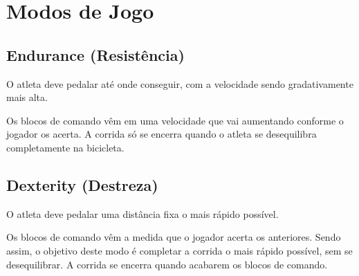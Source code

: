 \section{Modos de Jogo} 

\subsection{Endurance (Resistência)}

O atleta deve pedalar até onde conseguir, com a velocidade sendo gradativamente mais alta.

Os blocos de comando vêm em uma velocidade que vai aumentando conforme o jogador os acerta. A corrida só se encerra quando o atleta se desequilibra completamente na bicicleta.

\subsection{Dexterity (Destreza)}

O atleta deve pedalar uma distância fixa o mais rápido possível.

Os blocos de comando vêm a medida que o jogador acerta os anteriores. Sendo assim, o objetivo deste modo é completar a corrida o mais rápido possível, sem se desequilibrar. A corrida se encerra quando acabarem os blocos de comando.
